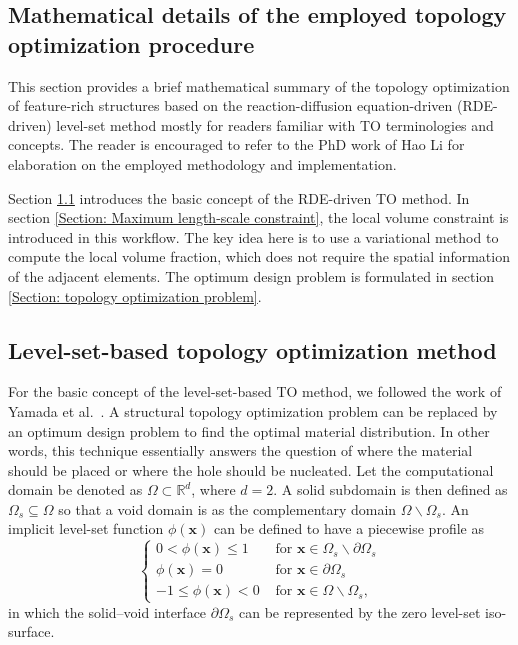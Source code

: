 \begin{subappendices}

\section[Mathematical details of the topology optimization procedure]{Mathematical details of the employed topology optimization procedure}


This section provides a brief mathematical summary of the topology optimization of feature-rich structures based on the reaction-diffusion equation-driven (\gls{RDE}-driven) level-set method mostly for readers familiar with TO terminologies and concepts. The reader is encouraged to refer to the PhD work of Hao Li \cite{Li2022Thesis} for elaboration on the employed methodology and implementation.

Section \ref{Section: level-set-based topology optimization method} introduces the basic concept of the \gls{RDE}-driven \gls{TO} method. In section \ref{Section: Maximum length-scale constraint}, the local volume constraint is introduced in this workflow. The key idea here is to use a variational method to compute the local volume fraction, which does not require the spatial information of the adjacent elements. The optimum design problem is formulated in section \ref{Section: topology optimization problem}.


\subsection{Level-set-based topology optimization method}\label{Section: level-set-based topology optimization method}
For the basic concept of the level-set-based \gls{TO} method, we followed the work of Yamada et al.\ \cite{yamada2010topology}. A structural topology optimization problem can be replaced by an optimum design problem to find the optimal material distribution. In other words, this technique essentially answers the question of where the material should be placed or where the hole should be nucleated. Let the computational domain be denoted as $\Omega \subset \mathbb{R}^d$, where $d=2$. A solid subdomain is then defined as $\Omega_{s} \subseteq \Omega$ so that a void domain is as the complementary domain $\Omega \backslash \Omega_{s}$. An implicit level-set function $\phi \left(\boldsymbol{x}\right)$ can be defined to have a piecewise profile as
\begin{equation}
	\left\{\begin{array}{ll}
		{0<\phi(\boldsymbol{x}) \leq 1} & {\text { for } \boldsymbol{x} \in \Omega_{s} \backslash \partial \Omega_{s}} \\
		{\phi(\boldsymbol{x})=0} & {\text { for } \boldsymbol{x} \in \partial \Omega_{s}} \\
		{-1 \leq \phi(\boldsymbol{x})<0} & {\text { for } \boldsymbol{x} \in \Omega \backslash \Omega_{s}},
	\end{array}\right.
\end{equation}
in which the solid--void interface $\partial \Omega_{s}$ can be represented by the zero level-set iso-surface.


\end{subappendices}
